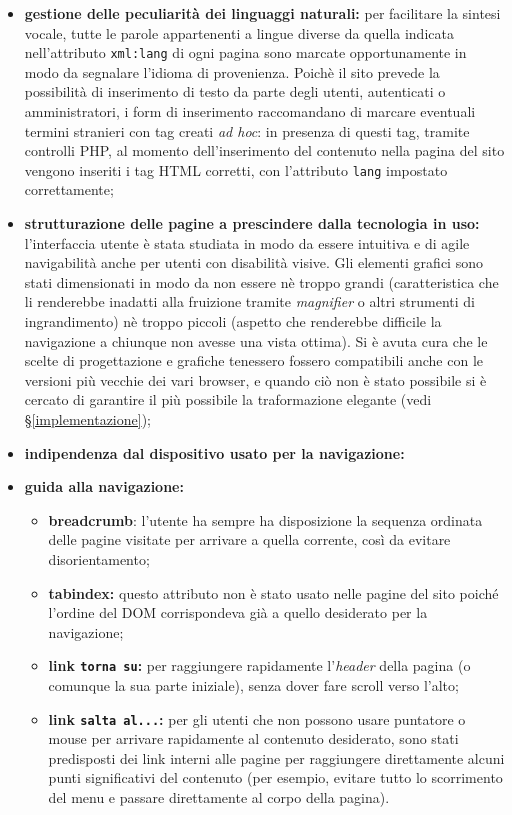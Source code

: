 \begin{itemize}
	\item \textbf{gestione delle peculiarità dei linguaggi naturali:} per facilitare la sintesi vocale, tutte le parole appartenenti a lingue diverse da quella indicata nell'attributo \texttt{xml:lang} di ogni pagina sono marcate opportunamente in modo da segnalare l'idioma di provenienza. Poichè il sito prevede la possibilità di inserimento di testo da parte degli utenti, autenticati o amministratori, i form di inserimento raccomandano di marcare eventuali termini stranieri con tag creati \textit{ad hoc}: in presenza di questi tag, tramite controlli PHP, al momento dell'inserimento del contenuto nella pagina del sito vengono inseriti i tag HTML corretti, con l'attributo \texttt{lang} impostato correttamente;
	\item \textbf{strutturazione delle pagine a prescindere dalla tecnologia in uso:} l'interfaccia utente è stata studiata in modo da essere intuitiva e di agile navigabilità anche per utenti con disabilità visive. Gli elementi grafici sono stati dimensionati in modo da non essere nè troppo grandi (caratteristica che li renderebbe inadatti alla fruizione tramite \textit{magnifier} o altri strumenti di ingrandimento) nè troppo piccoli (aspetto che renderebbe difficile la navigazione a chiunque non avesse una vista ottima). Si è avuta cura che le scelte di progettazione e grafiche tenessero fossero compatibili anche con le versioni più vecchie dei vari browser, e quando ciò non è stato possibile si è cercato di garantire il più possibile la traformazione elegante (vedi §\ref{implementazione});
	\item \textbf{indipendenza dal dispositivo usato per la navigazione:}
	\item \textbf{guida alla navigazione:}
	\begin{itemize}
		\item \textbf{breadcrumb}: l'utente ha sempre ha disposizione la sequenza ordinata delle pagine visitate per arrivare a quella corrente, così da evitare disorientamento;
		\item \textbf{tabindex:} questo attributo non è stato usato nelle pagine del sito poiché l'ordine del DOM corrispondeva già a quello desiderato per la navigazione;
		\item \textbf{link \texttt{torna su}:} per raggiungere rapidamente l'\textit{header} della pagina (o comunque la sua parte iniziale), senza dover fare scroll verso l'alto;
		\item \textbf{link \texttt{salta al...}:} per gli utenti che non possono usare puntatore o mouse per arrivare rapidamente al contenuto desiderato, sono stati predisposti dei link interni alle pagine per raggiungere direttamente alcuni punti significativi del contenuto (per esempio, evitare tutto lo scorrimento del menu e passare direttamente al corpo della pagina).
	\end{itemize}
\end{itemize}
